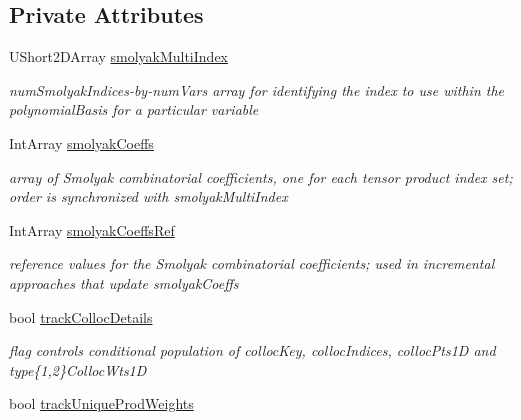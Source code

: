 \subsection*{Private Attributes}
\begin{DoxyCompactItemize}
\item 
U\+Short2\+D\+Array \hyperlink{classPecos_1_1CombinedSparseGridDriver_a189de9f4451d4da64b46cff2b4b1ba0d}{smolyak\+Multi\+Index}
\begin{DoxyCompactList}\small\item\em num\+Smolyak\+Indices-\/by-\/num\+Vars array for identifying the index to use within the polynomial\+Basis for a particular variable \end{DoxyCompactList}\item 
Int\+Array \hyperlink{classPecos_1_1CombinedSparseGridDriver_a85aa9102e925ab1e812393e2d42c7548}{smolyak\+Coeffs}\label{classPecos_1_1CombinedSparseGridDriver_a85aa9102e925ab1e812393e2d42c7548}

\begin{DoxyCompactList}\small\item\em array of Smolyak combinatorial coefficients, one for each tensor product index set; order is synchronized with smolyak\+Multi\+Index \end{DoxyCompactList}\item 
Int\+Array \hyperlink{classPecos_1_1CombinedSparseGridDriver_a9e7f6850393e6198600679fe06282e6c}{smolyak\+Coeffs\+Ref}\label{classPecos_1_1CombinedSparseGridDriver_a9e7f6850393e6198600679fe06282e6c}

\begin{DoxyCompactList}\small\item\em reference values for the Smolyak combinatorial coefficients; used in incremental approaches that update smolyak\+Coeffs \end{DoxyCompactList}\item 
bool \hyperlink{classPecos_1_1CombinedSparseGridDriver_abaebe18fcf1f074ef835d32d2932139a}{track\+Colloc\+Details}\label{classPecos_1_1CombinedSparseGridDriver_abaebe18fcf1f074ef835d32d2932139a}

\begin{DoxyCompactList}\small\item\em flag controls conditional population of colloc\+Key, colloc\+Indices, colloc\+Pts1D and type\{1,2\}Colloc\+Wts1D \end{DoxyCompactList}\item 
bool \hyperlink{classPecos_1_1CombinedSparseGridDriver_a81de4ed6a93f8aaa1c2ea141253a2d2a}{track\+Unique\+Prod\+Weights}\label{classPecos_1_1CombinedSparseGridDriver_a81de4ed6a93f8aaa1c2ea141253a2d2a}


\end{DoxyCompactItemize}
